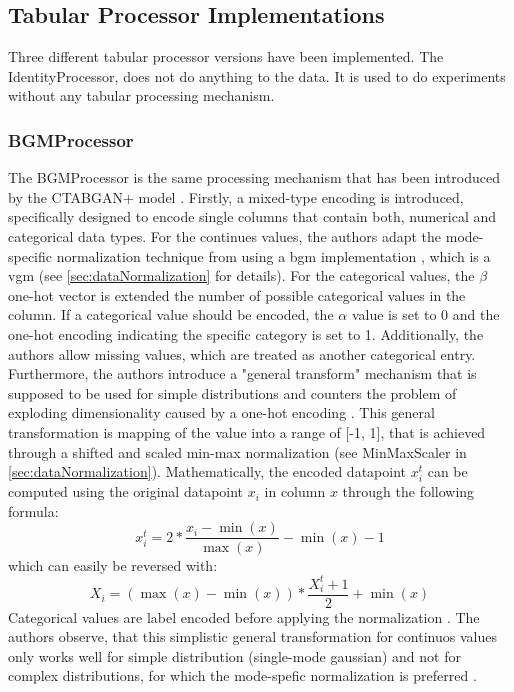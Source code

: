 \subsection[]{Tabular Processor Implementations}
\label{ch:architecture-tabularProcessor-implementations}

Three different tabular processor versions have been implemented.
The IdentityProcessor, does not do anything to the data.
It is used to do experiments without any tabular processing mechanism.

\subsubsection*{BGMProcessor}
\label{ch:BGMProcessor}

The BGMProcessor is the same processing mechanism that has been introduced by the CTABGAN+ model \cite{zhao2022CTABGANEnhancingTabular}.
Firstly, a mixed-type encoding is introduced, specifically designed to encode single columns that contain both, numerical and categorical data types.
For the continues values, the authors adapt the mode-specific normalization technique from \cite{xu2019ModelingTabularData} using a \gls{bgm} implementation \cite{BayesianGaussianMixture}, which is a \gls{vgm} (see \autoref{sec:dataNormalization} for details).
For the categorical values, the $\beta$ one-hot vector is extended the number of possible categorical values in the column.
If a categorical value should be encoded, the $\alpha$ value is set to 0 and the one-hot encoding indicating the specific category is set to 1.
Additionally, the authors allow missing values, which are treated as another categorical entry.
Furthermore, the authors introduce a "general transform" mechanism \cite[p. 7]{zhao2022CTABGANEnhancingTabular} that is supposed to be used for simple distributions and counters the problem of exploding dimensionality caused by a one-hot encoding \cite{zhao2022CTABGANEnhancingTabular}.
This general transformation is mapping of the value into a range of  [-1, 1], that is achieved through a shifted and scaled min-max normalization (see MinMaxScaler in \autoref{sec:dataNormalization}).
Mathematically, the encoded datapoint $x^t_i$ can be computed using the original datapoint $x_i$ in column $x$ through the following formula:
$$x^t_i=2* \frac{x_i-\min(x)}{\max(x)}-\min(x)-1$$
which can easily be reversed with:
$$X_i = (\max(x)-\min(x))*\frac{X^t_i+1}{2}+\min(x)$$
Categorical values are label encoded before applying the normalization \cite{zhao2022CTABGANEnhancingTabular}.
The authors observe, that this simplistic general transformation for continuos values only works well for simple distribution (\eg single-mode gaussian) and not for complex distributions, for which the mode-spefic normalization is preferred \cite{zhao2022CTABGANEnhancingTabular}.
